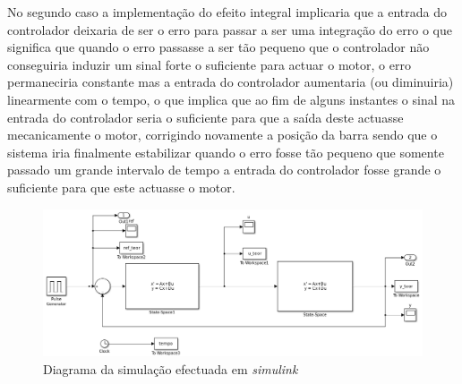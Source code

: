 \documentclass[%
  reprint,
  nofootinbib,
  amsmath,amssymb,
  aps,
  10pt,
  a4paper
]{revtex4-1}
\begin{document}
No segundo caso a implementação do efeito integral implicaria que a entrada do controlador deixaria de ser o erro para passar a ser uma integração do erro o que significa que quando o erro passasse a ser tão pequeno que o controlador não conseguiria induzir um sinal forte o suficiente para actuar o motor, o erro permaneciria constante mas a entrada do controlador aumentaria (ou diminuiria) linearmente com o tempo, o que implica que ao fim de alguns instantes o sinal na entrada do controlador seria o suficiente para que a saída deste actuasse mecanicamente o motor, corrigindo novamente a posição da barra sendo que o sistema iria finalmente estabilizar quando o erro fosse tão pequeno que somente passado um grande intervalo de tempo a entrada do controlador fosse grande o suficiente para que este actuasse o motor.
\begin{figure}[T]
  \includegraphics[width=.6\textheight]{../img/simulink.png}%
  \caption{\label{../img/simulink.png} Diagrama da simulação efectuada em {\it simulink}}
\end{figure}


\nocite{*}
{}
\end{document}
